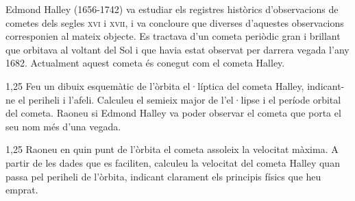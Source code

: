 Edmond Halley (1656-1742) va estudiar els registres històrics d'observacions de cometes dels segles \textsc{xvi} i \textsc{xvii}, i va concloure que diverses d'aquestes observacions corresponien al mateix objecte. Es tractava d'un cometa periòdic gran i brillant que orbitava al voltant del Sol i que havia estat observat per darrera vegada l'any 1682. Actualment aquest cometa és conegut com el cometa Halley.

\begin{apartat}{1,25}
Feu un dibuix esquemàtic de l'òrbita el·líptica del cometa Halley, indicant-ne el periheli i l'afeli. Calculeu el semieix major de l'el·lipse i el període orbital del cometa. Raoneu si Edmond Halley va poder observar el cometa que porta el seu nom més d'una vegada.
\end{apartat}

\begin{apartat}{1,25}
Raoneu en quin punt de l'òrbita el cometa assoleix la velocitat màxima. A partir de les dades que es faciliten, calculeu la velocitat del cometa Halley quan passa pel periheli de l'òrbita, indicant clarament els principis físics que heu emprat.
\end{apartat}

